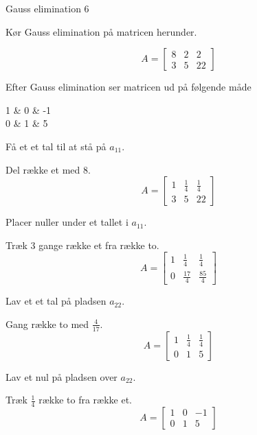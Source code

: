 \documentclass{article}
\begin{document}
\begin{exercise}{Gauss elimination 6}
	
	
	Kør Gauss elimination på matricen herunder.
	
	\[
	A = \left[\begin{array}{rr|r}
	8 & 2 & 2 \\ 
	3 & 5 & 22
	\end{array} \right]
	\]
	
	Efter Gauss elimination ser matricen ud på følgende måde
	\begin{answermatrix}
		1 & 0 & -1 \\
		0 & 1 & 5
	\end{answermatrix}
	
	\hint
	Få et et tal til at stå på $a_{11}$.
	
	\hint
	Del række et med 8. 
	\[
	A = \left[\begin{array}{rr|r}
	1 & \frac{1}{4} & \frac{1}{4} \\ 
	3 & 5 & 22
	\end{array} \right]
	\]
	
	\hint
	Placer nuller under et tallet i $a_{11}$.
	
	\hint
	Træk 3 gange række et fra række to.
	\[
	A = \left[\begin{array}{rr|r}
	1 & \frac{1}{4} & \frac{1}{4} \\ 
	0 & \frac{17}{4} & \frac{85}{4}
	\end{array} \right]
	\]
	
	\hint
	Lav et et tal på pladsen $a_{22}$.
	
	\hint
	Gang række to med $\frac{4}{17}$.
	\[
	A = \left[\begin{array}{rr|r}
	1 & \frac{1}{4} & \frac{1}{4} \\ 
	0 & 1 & 5
	\end{array} \right]
	\]
	
	
	\hint
	Lav et nul på pladsen over $a_{22}$.
	
	\hint
	Træk $\frac{1}{4}$ række to fra række et.
	\[
	A = \left[\begin{array}{rr|r}
	1 & 0 & -1 \\ 
	0 & 1 & 5
	\end{array} \right]
	\]
	
	
\end{exercise}

\newpage
\end{document}
